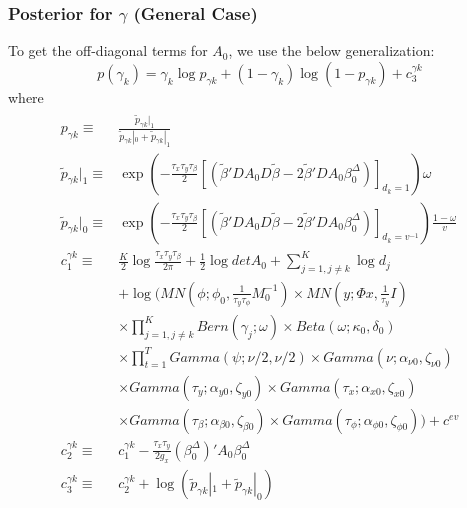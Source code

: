 \documentclass[11pt]{article}
\begin{document}
\subsubsection{Posterior for $\gamma$ (General Case)}
To get the off-diagonal terms for $A_0$, we use the below generalization:
\begin{equation}
	p\left(\gamma_{k}\right) = \gamma_{k}\log p_{\gamma k}+\left(1-\gamma_{k}\right)\log\left(1-p_{\gamma k}\right)+c_{3}^{\gamma k}
\end{equation}
where
\begin{align*}
\begin{split}
	p_{\gamma k}\equiv&\frac{\tilde{p}_{\gamma k}|_{1}}{\tilde{p}_{\gamma k}|_{0}+\tilde{p}_{\gamma k}|_{1}}\\\tilde{p}_{\gamma k}|_{1}\equiv&\exp\left(-\frac{\tau_{x}\tau_{y}\tau_{\beta}}{2}\left[\left(\tilde{\beta}'DA_{0}D\tilde{\beta}-2\tilde{\beta}'DA_{0}\beta_{0}^{\Delta}\right)\right]_{d_{k}=1}\right)\omega\\\tilde{p}_{\gamma k}|_{0}\equiv&\exp\left(-\frac{\tau_{x}\tau_{y}\tau_{\beta}}{2}\left[\left(\tilde{\beta}'DA_{0}D\tilde{\beta}-2\tilde{\beta}'DA_{0}\beta_{0}^{\Delta}\right)\right]_{d_{k}=v^{-1}}\right)\frac{1-\omega}{v}\\c_{1}^{\gamma k}\equiv&\frac{K}{2}\log\frac{\tau_{x}\tau_{y}\tau_{\beta}}{2\pi}+\frac{1}{2}\log detA_{0}+\sum_{j=1,j\ne k}^{K}\log d_{j}\\&+\log\Bigg(MN\left(\phi;\phi_{0},\frac{1}{\tau_{y}\tau_{\phi}}M_{0}^{-1}\right)\times MN\left(y;\Phi x,\frac{1}{\tau_{y}}I\right)\\&\times\prod_{j=1,j\ne k}^{K}Bern\left(\gamma_{j};\omega\right)\times Beta\left(\omega;\kappa_{0},\delta_{0}\right)\\&\times\prod_{t=1}^{T}Gamma\left(\psi;\nu/2,\nu/2\right)\times Gamma\left(\nu;\alpha_{\nu0},\zeta_{\nu0}\right)\\&\times Gamma\left(\tau_{y};\alpha_{y0},\zeta_{y0}\right)\times Gamma\left(\tau_{x};\alpha_{x0},\zeta_{x0}\right)\\&\times Gamma\left(\tau_{\beta};\alpha_{\beta0},\zeta_{\beta0}\right)\times Gamma\left(\tau_{\phi};\alpha_{\phi0},\zeta_{\phi0}\right)\Bigg)+c^{ev}\\c_{2}^{\gamma k}\equiv&c_{1}^{\gamma k}-\frac{\tau_{x}\tau_{y}}{2g_{x}}\left(\beta_{0}^{\Delta}\right)'A_{0}\beta_{0}^{\Delta}\\c_{3}^{\gamma k}\equiv&c_{2}^{\gamma k}+\log\left(\tilde{p}_{\gamma k}|_{1}+\tilde{p}_{\gamma k}|_{0}\right)
\end{split}
\end{align*}
\end{document}
